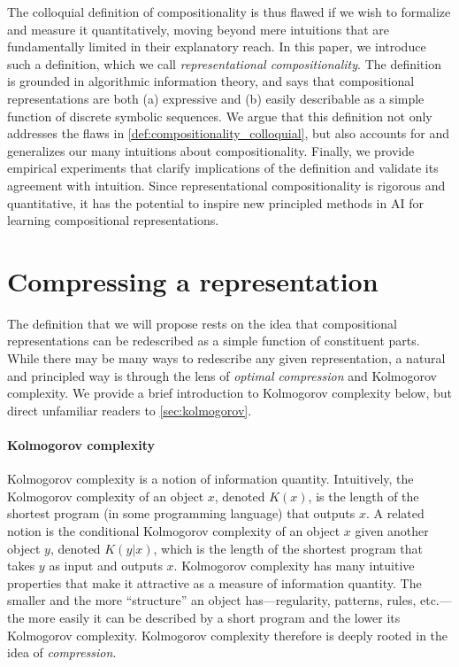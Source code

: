 \documentclass{article}
\newcommand{\comp}{representational compositionality}
\begin{document}
The colloquial definition of compositionality is thus flawed if we wish to formalize and measure it quantitatively, moving beyond mere intuitions that are fundamentally limited in their explanatory reach. In this paper, we introduce such a definition, which we call \textit{\comp{}}. The definition is grounded in algorithmic information theory, and says that compositional representations are both (a) expressive and (b) easily describable as a simple function of discrete symbolic sequences. We argue that this definition not only addresses the flaws in \cref{def:compositionality_colloquial}, but also accounts for and generalizes our many intuitions about compositionality. Finally, we provide empirical experiments that clarify implications of the definition and validate its agreement with intuition. Since \comp{} is rigorous and quantitative, it has the potential to inspire new principled methods in AI for learning compositional representations.


\section{Compressing a representation}
\label{sec:compression}

The definition that we will propose rests on the idea that compositional representations can be redescribed as a simple function of constituent parts. While there may be many ways to redescribe any given representation, a natural and principled way is through the lens of \textit{optimal compression} and Kolmogorov complexity. We provide a brief introduction to Kolmogorov complexity below, but direct unfamiliar readers to \cref{sec:kolmogorov}.

\paragraph{Kolmogorov complexity}

Kolmogorov complexity \citep{li2008introduction,kolmogorov1965three} is a notion of information quantity. Intuitively, the Kolmogorov complexity of an object $x$, denoted $K(x)$, is the length of the shortest program (in some programming language) that outputs $x$. A related notion is the conditional Kolmogorov complexity of an object $x$ given another object $y$, denoted $K(y|x)$, which is the length of the shortest program that takes $y$ as input and outputs $x$. Kolmogorov complexity has many intuitive properties that make it attractive as a measure of information quantity. The smaller and the more ``structure'' an object has---regularity, patterns, rules, etc.---the more easily it can be described by a short program and the lower its Kolmogorov complexity. Kolmogorov complexity therefore is deeply rooted in the idea of \emph{compression}.
\end{document}
